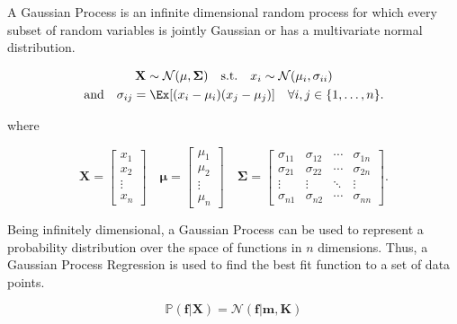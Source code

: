 \documentclass{article}
\begin{document}
A Gaussian Process is an infinite dimensional random process for which every subset of random variables is jointly Gaussian or has a multivariate normal distribution.

\begin{equation}
\begin{gathered}
        \mathbf{X} \sim \mathcal{N}(\mathbf{\mu}, \mathbf{\Sigma}) \quad \text{s.t.} \quad x_i \sim \mathcal{N}(\mu_i, \sigma_
        {ii}) \\
        \text{and} \quad \sigma_{ij} = \Ex[(x_i - \mu_i)(x_j - \mu_j)] \quad \forall i,j \in \{1, \ldots, n\}.
    \end{gathered}
\end{equation}

where

\begin{equation}
\mathbf{X} = \begin{bmatrix}
        x_1    \\
        x_2    \\
        \vdots \\
        x_n
    \end{bmatrix}
    \quad
    \mathbf{\mu} = \begin{bmatrix}
        \mu_1  \\
        \mu_2  \\
        \vdots \\
        \mu_n
    \end{bmatrix}
    \quad
    \mathbf{\Sigma} = \begin{bmatrix}
        \sigma_{11} & \sigma_{12} & \cdots & \sigma_{1n} \\
        \sigma_{21} & \sigma_{22} & \cdots & \sigma_{2n} \\
        \vdots      & \vdots      & \ddots & \vdots      \\
        \sigma_{n1} & \sigma_{n2} & \cdots & \sigma_{nn}
    \end{bmatrix}.
\end{equation}

Being infinitely dimensional, a Gaussian Process can be used to represent a probability distribution over the space of functions in $n$ dimensions. Thus, a Gaussian Process Regression is used to find the best fit function to a set of data points.

\begin{equation}
\mathbb{P}(\mathbf{f} | \mathbf{X}) = \mathcal{N}(\mathbf{f} | \mathbf{m}, \mathbf{K})
\end{equation}
\end{document}
